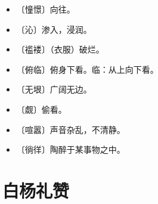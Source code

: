\documentclass[12pt,UTF-8,openany]{ctexbook}
\begin{document}
\vspace{-1em}

\begin{itemize}
    \setlength\itemsep{-0.2em}
    \item 〔憧憬〕向往。
    \item 〔沁〕渗入，浸润。
    \item 〔褴褛〕（衣服）破烂。
    \item 〔俯临〕俯身下看。临：从上向下看。
    \item 〔无垠〕广阔无边。
    \item 〔觑〕偷看。
    \item 〔喧嚣〕声音杂乱，不清静。
    \item 〔徜徉〕陶醉于某事物之中。
\end{itemize}

\chapter{白杨礼赞}
\end{document}
